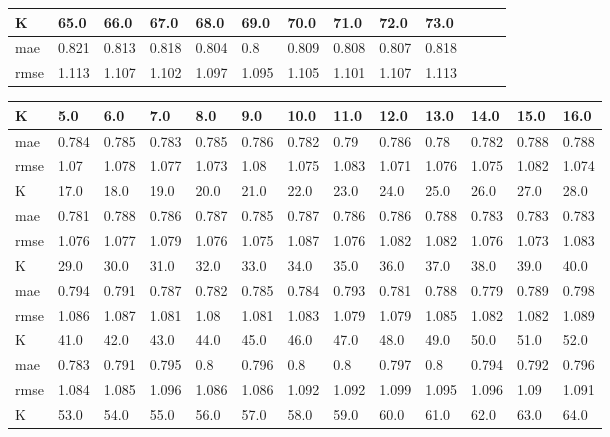 \begin{appendices}
\begin{center}
\begin{tabularx}{\textwidth}{|l|X|X|X|X|X|X|X|X|X|X|X|X|}
		\hline 
		K & 65.0 & 66.0 & 67.0 & 68.0 & 69.0 & 70.0 & 71.0 & 72.0 & 73.0  & & & \\ \hline 
		mae & 0.821 & 0.813 & 0.818 & 0.804 & 0.8 & 0.809 & 0.808 & 0.807 & 0.818 & & &  \\ \hline 
		rmse & 1.113 & 1.107 & 1.102 & 1.097 & 1.095 & 1.105 & 1.101 & 1.107 & 1.113  & & & \\ \hline 
	\end{tabularx} 
\end{center}
\begin{center} 
	\begin{tabularx}{\textwidth}{|l|X|X|X|X|X|X|X|X|X|X|X|X|} 
		\hline 
		K & 5.0 & 6.0 & 7.0 & 8.0 & 9.0 & 10.0 & 11.0 & 12.0 & 13.0 & 14.0 & 15.0 & 16.0 \\ \hline 
		mae & 0.784 & 0.785 & 0.783 & 0.785 & 0.786 & 0.782 & 0.79 & 0.786 & 0.78 & 0.782 & 0.788 & 0.788 \\ \hline 
		rmse & 1.07 & 1.078 & 1.077 & 1.073 & 1.08 & 1.075 & 1.083 & 1.071 & 1.076 & 1.075 & 1.082 & 1.074 \\ \hline 
		\hline 
		K & 17.0 & 18.0 & 19.0 & 20.0 & 21.0 & 22.0 & 23.0 & 24.0 & 25.0 & 26.0 & 27.0 & 28.0 \\ \hline 
		mae & 0.781 & 0.788 & 0.786 & 0.787 & 0.785 & 0.787 & 0.786 & 0.786 & 0.788 & 0.783 & 0.783 & 0.783 \\ \hline 
		rmse & 1.076 & 1.077 & 1.079 & 1.076 & 1.075 & 1.087 & 1.076 & 1.082 & 1.082 & 1.076 & 1.073 & 1.083 \\ \hline 
		\hline 
		K & 29.0 & 30.0 & 31.0 & 32.0 & 33.0 & 34.0 & 35.0 & 36.0 & 37.0 & 38.0 & 39.0 & 40.0 \\ \hline 
		mae & 0.794 & 0.791 & 0.787 & 0.782 & 0.785 & 0.784 & 0.793 & 0.781 & 0.788 & 0.779 & 0.789 & 0.798 \\ \hline 
		rmse & 1.086 & 1.087 & 1.081 & 1.08 & 1.081 & 1.083 & 1.079 & 1.079 & 1.085 & 1.082 & 1.082 & 1.089 \\ \hline 
		\hline 
		K & 41.0 & 42.0 & 43.0 & 44.0 & 45.0 & 46.0 & 47.0 & 48.0 & 49.0 & 50.0 & 51.0 & 52.0 \\ \hline 
		mae & 0.783 & 0.791 & 0.795 & 0.8 & 0.796 & 0.8 & 0.8 & 0.797 & 0.8 & 0.794 & 0.792 & 0.796 \\ \hline 
		rmse & 1.084 & 1.085 & 1.096 & 1.086 & 1.086 & 1.092 & 1.092 & 1.099 & 1.095 & 1.096 & 1.09 & 1.091 \\ \hline 
		\hline 
		K & 53.0 & 54.0 & 55.0 & 56.0 & 57.0 & 58.0 & 59.0 & 60.0 & 61.0 & 62.0 & 63.0 & 64.0 \\ \hline 

\end{tabularx}
\end{center}
\end{appendices}
